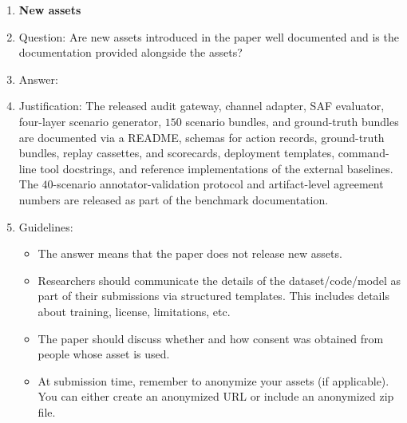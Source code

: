 \begin{enumerate}
\item {\bf New assets}
    \item[] Question: Are new assets introduced in the paper well documented and is the documentation provided alongside the assets?
    \item[] Answer: \answerYes{}
    \item[] Justification: The released audit gateway, channel adapter, SAF evaluator, four-layer scenario generator, $150$ scenario bundles, and ground-truth bundles are documented via a README, schemas for action records, ground-truth bundles, replay cassettes, and scorecards, deployment templates, command-line tool docstrings, and reference implementations of the external baselines. The $40$-scenario annotator-validation protocol and artifact-level agreement numbers are released as part of the benchmark documentation.
    \item[] Guidelines:
    \begin{itemize}
        \item The answer \answerNA{} means that the paper does not release new assets.
        \item Researchers should communicate the details of the dataset\slash code\slash model as part of their submissions via structured templates. This includes details about training, license, limitations, etc.
        \item The paper should discuss whether and how consent was obtained from people whose asset is used.
        \item At submission time, remember to anonymize your assets (if applicable). You can either create an anonymized URL or include an anonymized zip file.
    \end{itemize}


\end{enumerate}
